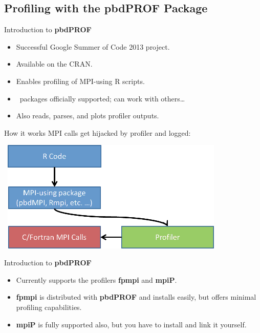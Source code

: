 \subsection{Profiling with the pbdPROF Package}
\makesubcontentsslidessec


\begin{frame}
  \begin{block}{Introduction to \textbf{pbdPROF}}
    \begin{itemize}
      \item Successful Google Summer of Code 2013 project.
      \item Available on the CRAN.
      \item Enables profiling of MPI-using R scripts.
      \item \pbdR\ packages officially supported; can work with others\dots
      \item Also reads, parses, and plots profiler outputs.
    \end{itemize}
  \end{block}
\end{frame}


\begin{frame}
  \begin{block}{How it works}
  MPI calls get hijacked by profiler and logged:
	\begin{center}
	  \ \hspace{2cm}\includegraphics[width=0.8\textwidth]{../common/pics/prof/mpi_profiler}
	\end{center}
  \end{block}
\end{frame}


\begin{frame}
  \begin{block}{Introduction to \textbf{pbdPROF}}
    \begin{itemize}
      \item Currently supports the profilers \textbf{fpmpi} and \textbf{mpiP}.
      \item \textbf{fpmpi} is distributed with \textbf{pbdPROF} and installs easily, but offers 
minimal profiling capabilities.
      \item \textbf{mpiP} is fully supported also, but you have to install and 
link it yourself.
    \end{itemize}
  \end{block}
\end{frame}
